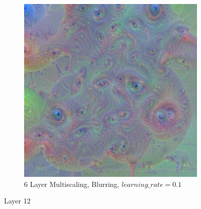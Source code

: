 \begin{figure}
    \begin{subfigure}[t]{0.31\textwidth}
        \captionsetup{justification=centering}
        \centering
        \includegraphics[width=.7\linewidth]{figuras/feat_vis/experiments/final/l12/random_image_pl6_lr1e-1_layer26.png}
        \caption{6 Layer Multiscaling, Blurring, \(learning\_rate = 0.1\)}
    \end{subfigure}

    \caption{Layer 12}
    \label{fig:layer_12}
\end{figure}

